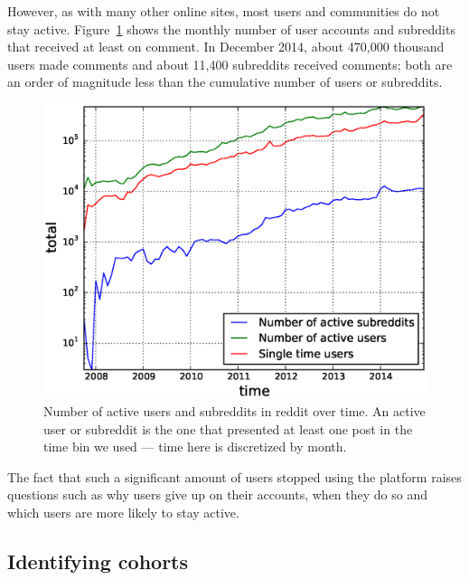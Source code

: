 However, as with many other online sites, most users \cite{} and communities \cite{butler/kraut paper} do not stay active.  Figure~\ref{fig:active_users_subreddits} shows the monthly number of user accounts and subreddits that received at least on comment.  In December 2014, about 470,000 thousand users made comments and about 11,400 subreddits received comments; both are an order of magnitude less than the cumulative number of users or subreddits.  

\begin{figure}[!tb]
\centering
\includegraphics[scale=0.4]{./images/active_users_subreddits.eps}
\caption{Number of active users and subreddits in reddit over time. An active user or subreddit is the one that presented at least one post in the time bin we used --- time here is discretized by month.}
\label{fig:active_users_subreddits}
\end{figure}


The fact that such a significant amount of users stopped using the platform raises questions such as why users give up on their accounts, when they do so and which users are more likely to stay active. 

\subsection{Identifying cohorts}
